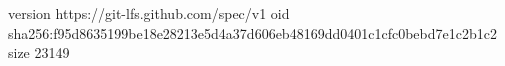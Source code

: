 version https://git-lfs.github.com/spec/v1
oid sha256:f95d8635199be18e28213e5d4a37d606eb48169dd0401c1cfc0bebd7e1c2b1c2
size 23149
